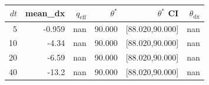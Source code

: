\begin{tabular}{r r r r r r}
\hline
$dt$ & mean\_dx & $q_{\mathrm{eff}}$ & $\theta^*$ & $\theta^*$ CI & $\theta_{\mathrm{dx}}$ \\
\hline
5 & -0.959 & nan & 90.000 & [88.020,90.000] & nan \\
10 & -4.34 & nan & 90.000 & [88.020,90.000] & nan \\
20 & -6.59 & nan & 90.000 & [88.020,90.000] & nan \\
40 & -13.2 & nan & 90.000 & [88.020,90.000] & nan \\
\hline
\end{tabular}
